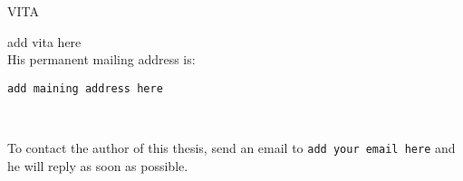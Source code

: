 \begin{center}
{\Large VITA}
\end{center}

\noindent add vita here\\

\noindent His permanent mailing address is:

\begin{minipage}[t]{.5\textwidth}
	\begin{flushright}
		\texttt{add maining address here} 
	\end{flushright}
\end{minipage}
\\
\vspace*{1em}

\noindent To contact the author of this thesis, send an email to \texttt{add your email here} and he will reply as soon as possible.
\vspace*{10em}

